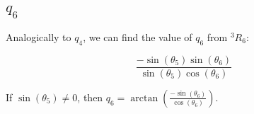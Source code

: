 \documentclass{article}
\begin{document}


\subsection{$q_6$}

Analogically to $q_4$, we can find the value of $q_6$ from ${}^3R_6$:

\[\frac{-\sin(\theta_5) \sin(\theta_6)}{\sin(\theta_5) \cos(\theta_6)}\]

If $\sin(\theta_5) \neq 0$, then $q_6 = \arctan(\frac{-\sin(\theta_6)}{\cos(\theta_6)})$. 









\end{document}
